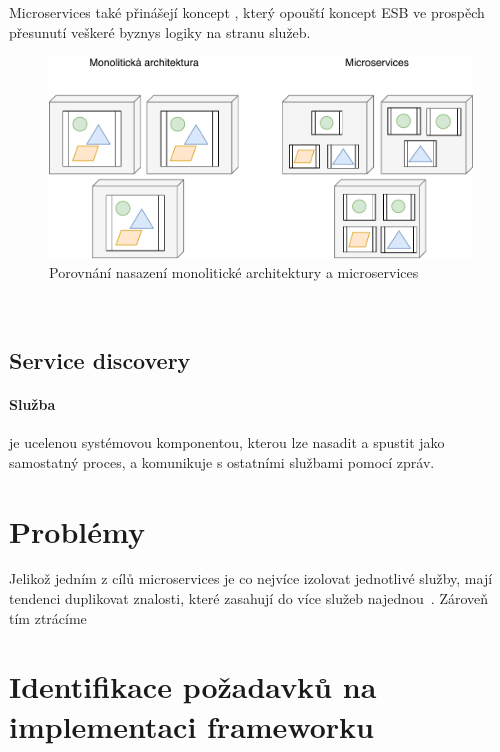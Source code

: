 Microservices také přinášejí koncept ,
který opouští koncept ESB ve prospěch přesunutí veškeré byznys logiky
na stranu služeb.


\begin{figure}
    \centering
    \includegraphics[keepaspectratio=true, width=0.8\linewidth]{figures/microservices-deployment.pdf}
    \caption{Porovnání nasazení monolitické architektury a microservices}
    \label{fig:microservices-deployment}
\end{figure}

~\cite{perrey2003service}
~\cite{cerny2017disambiguation}
~\cite{sprott2004understanding}

\subsection{Service discovery}


\paragraph{Služba} je ucelenou systémovou komponentou,
kterou lze nasadit a spustit jako samostatný proces, a
komunikuje s ostatními službami pomocí zpráv.

\section{Problémy}

Jelikož jedním z cílů microservices je co nejvíce izolovat
jednotlivé služby, mají tendenci duplikovat znalosti, které
zasahují do více služeb najednou~\cite{cerny2017disambiguation}.
Zároveň tím ztrácíme

\section{Identifikace požadavků na implementaci frameworku}

